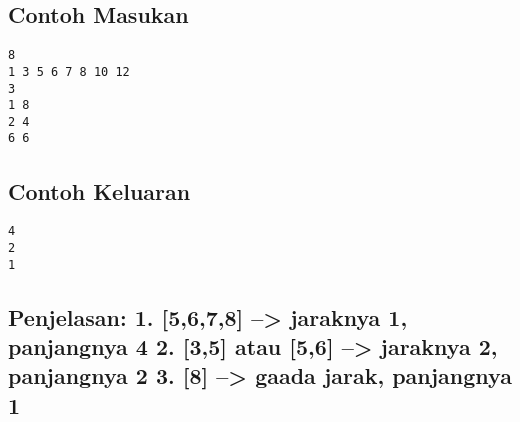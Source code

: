 \documentclass{article}
\begin{document}
\begin{multicols}{2}
\subsection*{Contoh Masukan}
\begin{lstlisting}
8
1 3 5 6 7 8 10 12
3
1 8
2 4
6 6
\end{lstlisting}
\columnbreak
\subsection*{Contoh Keluaran}
\begin{lstlisting}
4
2
1
\end{lstlisting}
\vfill
\null
\end{multicols}

\subsection*{
Penjelasan:
1. [5,6,7,8] --> jaraknya 1, panjangnya 4
2. [3,5] atau [5,6] --> jaraknya 2, panjangnya 2
3. [8] --> gaada jarak, panjangnya 1
}


\pagebreak
\end{document}
